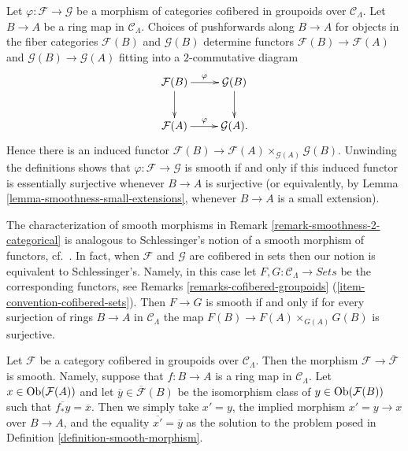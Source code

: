\begin{remark}
\label{remark-smoothness-2-categorical}
Let $\varphi : \mathcal{F} \to \mathcal{G}$ be a morphism of categories
cofibered in groupoids over $\mathcal{C}_\Lambda$.  Let $B \to A$ be a
ring map in $\mathcal{C}_\Lambda$.  Choices of pushforwards along $B
\to A$ for objects in the fiber categories $\mathcal{F}(B)$ and
$\mathcal{G}(B)$ determine functors $\mathcal{F}(B) \to \mathcal{F}(A)$
and $\mathcal{G}(B) \to \mathcal{G}(A)$ fitting into a $2$-commutative
diagram
$$
\xymatrix{
\mathcal{F}(B) \ar[r]^{\varphi} \ar[d] & \mathcal{G}(B) \ar[d] \\
\mathcal{F}(A) \ar[r]^{\varphi}        & \mathcal{G}(A) .
}
$$
Hence there is an induced functor $\mathcal{F}(B) \to \mathcal{F}(A)
\times_{\mathcal{G}(A)} \mathcal{G}(B)$.  Unwinding the definitions shows that
$\varphi : \mathcal{F} \to \mathcal{G}$ is smooth if and only if this
induced functor is essentially surjective whenever $B \to A$ is
surjective (or equivalently, by
Lemma \ref{lemma-smoothness-small-extensions},
whenever $B \to A$ is a small extension).
\end{remark}

\begin{remark}
\label{remark-compare-smooth-schlessinger}
The characterization of smooth morphisms in
Remark \ref{remark-smoothness-2-categorical}
is analogous to Schlessinger's notion of
a smooth morphism of functors, cf.\ \cite[Definition 2.2.]{Sch}. In
fact, when $\mathcal{F}$ and $\mathcal{G}$ are cofibered in sets
then our notion is equivalent to Schlessinger's. Namely, in this case
let $F, G : \mathcal{C}_\Lambda \to \textit{Sets}$ be the corresponding
functors, see
Remarks \ref{remarks-cofibered-groupoids}
(\ref{item-convention-cofibered-sets}).
Then $F \to G$ is smooth if and only if for every surjection of rings
$B \to A$ in $\mathcal{C}_\Lambda$ the map $F(B) \to F(A) \times_{G(A)} G(B)$
is surjective.
\end{remark}

\begin{remark}
\label{remark-smooth-to-iso-classes}
Let $\mathcal{F}$ be a category cofibered in groupoids over
$\mathcal{C}_\Lambda$. Then the morphism
$\mathcal{F} \to \overline{\mathcal{F}}$ is smooth.
Namely, suppose that $f : B \to A$ is a ring map in $\mathcal{C}_\Lambda$.
Let $x \in \mathop{\mathrm{Ob}}\nolimits(\mathcal{F}(A))$ and let
$\overline{y} \in \overline{\mathcal{F}}(B)$
be the isomorphism class of $y \in \mathop{\mathrm{Ob}}\nolimits(\mathcal{F}(B))$ such that
$\overline{f_*y} = \overline{x}$. Then we simply take $x' = y$, the
implied morphism $x' = y \to x$ over $B \to A$, and the equality
$\overline{x'} = \overline{y}$ as the solution to
the problem posed in Definition \ref{definition-smooth-morphism}.
\end{remark}

